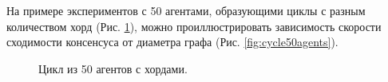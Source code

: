 \documentclass[a4paper,article,14pt]{extarticle}
\begin{document}
На примере экспериментов с 50 агентами, образующими циклы с разным количеством хорд (Рис. \ref{fig:cycle50}), можно проиллюстрировать зависимость скорости сходимости консенсуса от диаметра графа (Рис. \ref{fig:cycle50agents}).

\begin{figure}[H]
\begin{center}
\caption{
\label{fig:cycle50}
    Цикл из 50 агентов с хордами.}
\end{center}
\end{figure}
\end{document}
